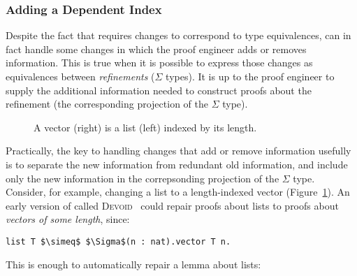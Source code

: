 \subsubsection{Adding a Dependent Index}
\label{sec:ex2}

Despite the fact that \toolname requires changes to correspond to type equivalences,
\toolname can in fact handle some changes in which the proof engineer adds or removes information.
This is true when it is possible to express those changes as equivalences between \textit{refinements} ($\Sigma$ types).
It is up to the proof engineer to supply the additional information needed to construct proofs about the refinement
(the corresponding projection of the $\Sigma$ type).



\begin{figure}
\begin{minipage}{0.40\textwidth}
   
\end{minipage}
\hfill
\begin{minipage}{0.58\textwidth}
   
\end{minipage}
\vspace{-0.3cm}
\caption{A vector (right) is a list (left) indexed by its length.}
\label{fig:listtovect}
\end{figure}

Practically, the key to handling changes that add or remove information usefully is to separate the new information from redundant old information, 
and include only the new information in the correpsonding projection of the $\Sigma$ type.
Consider, for example, changing a list to a length-indexed vector (Figure~\ref{fig:listtovect}).
An early version of \toolname called \textsc{Devoid}~\cite{Ringer2019} could repair proofs about lists to proofs about \textit{vectors of some length}, since:

\begin{lstlisting}
list T $\simeq$ $\Sigma$(n : nat).vector T n.
\end{lstlisting}
This is enough to automatically repair a lemma about lists:

